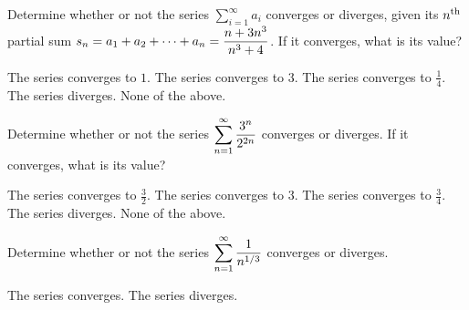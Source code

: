 \documentclass[12pt]{exam}
\newcommand{\ds}{\ensuremath{\displaystyle}}
\begin{document}
\begin{center}
\end{center}
\vspace{0.1in}

\begin{questions}

\setcounter{question}{0}
\question[5]
Determine whether or not the series $\sum_{i=1}^\infty a_i$ converges or
diverges, given its $n^{\rm th}$ partial sum
$\ds s_n = a_1 + a_2 + \cdots + a_n = \frac{n+3n^3}{n^3+4}$. If it converges,
what is its value?

\begin{checkboxes}
\choice The series converges to $1$.
\CorrectChoice The series converges to $3$.
\choice The series converges to $\frac{1}{4}$.
\choice The series diverges.
\choice None of the above.
\end{checkboxes}

\vfill

\question[10]
Determine whether or not the series $\ds\sum_{n=1}^\infty \frac{3^n}{2^{2n}}$
converges or diverges. If it converges, what is its value?

\begin{checkboxes}
\choice The series converges to $\frac{3}{2}$.
\CorrectChoice The series converges to $3$.
\choice The series converges to $\frac{3}{4}$.
\choice The series diverges.
\choice None of the above.
\end{checkboxes}

\vfill

\question[5]
Determine whether or not the series $\ds\sum_{n=1}^{\infty} \frac{1}{n^{1/3}}$
converges or diverges.

\begin{checkboxes}
\choice The series converges.
\CorrectChoice The series diverges.
\end{checkboxes}

\vfill

\end{questions}
\end{document}
